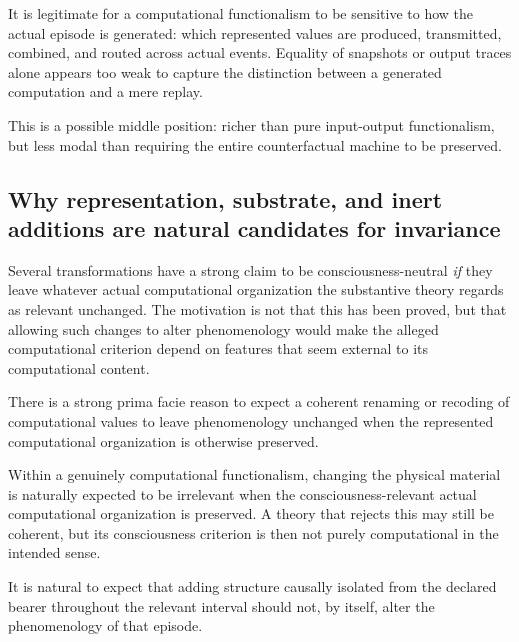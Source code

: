 \documentclass[11pt,a4paper]{article}
\begin{document}
\begin{principlebox}[title={Generative-Process Sensitivity: a plausible allowance}]
It is legitimate for a computational functionalism to be sensitive to how the actual episode is generated: which represented values are produced, transmitted, combined, and routed across actual events. Equality of snapshots or output traces alone appears too weak to capture the distinction between a generated computation and a mere replay.
\end{principlebox}

This is a possible middle position: richer than pure input-output functionalism, but less modal than requiring the entire counterfactual machine to be preserved.

\subsection{Why representation, substrate, and inert additions are natural candidates for invariance}

Several transformations have a strong claim to be consciousness-neutral \emph{if} they leave whatever actual computational organization the substantive theory regards as relevant unchanged. The motivation is not that this has been proved, but that allowing such changes to alter phenomenology would make the alleged computational criterion depend on features that seem external to its computational content.

\begin{principlebox}[title={Representation Invariance: a natural expectation}]
There is a strong prima facie reason to expect a coherent renaming or recoding of computational values to leave phenomenology unchanged when the represented computational organization is otherwise preserved.
\end{principlebox}

\begin{principlebox}[title={Substrate Invariance: a natural expectation}]
Within a genuinely computational functionalism, changing the physical material is naturally expected to be irrelevant when the consciousness-relevant actual computational organization is preserved. A theory that rejects this may still be coherent, but its consciousness criterion is then not purely computational in the intended sense.
\end{principlebox}

\begin{principlebox}[title={Inert-Extension Invariance: a natural expectation}]
It is natural to expect that adding structure causally isolated from the declared bearer throughout the relevant interval should not, by itself, alter the phenomenology of that episode.
\end{principlebox}
\end{document}
